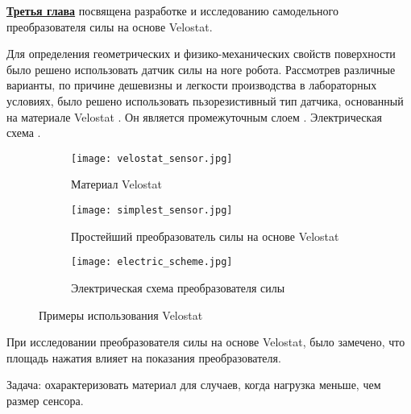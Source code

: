 
\textbf{\underline{Третья глава}} посвящена разработке и исследованию самодельного преобразователя силы на основе Velostat.

Для определения геометрических и физико-механических свойств поверхности было решено использовать датчик силы на ноге робота. Рассмотрев различные варианты, по причине дешевизны и легкости производства в лабораторных условиях, было решено использовать пьзорезистивный тип датчика, основанный на материале Velostat . Он является промежуточным слоем . Электрическая схема . 


\begin{figure}[ht]
    \begin{subfigure}[t]{0.33\textwidth}
        \centering\texttt{[image: velostat\_sensor.jpg]}
        \caption{Материал Velostat}
        \label{fig:velostat_sensor.jpg}
    \end{subfigure}
    \begin{subfigure}[t]{0.33\textwidth}
        \centering\texttt{[image: simplest\_sensor.jpg]}
        \caption{Простейший преобразователь силы на основе Velostat}
        \label{fig:simplest_sensor.jpg}
    \end{subfigure}
    \begin{subfigure}[t]{0.33\textwidth}
        \centering\texttt{[image: electric\_scheme.jpg]}\\
        \caption{Электрическая схема преобразователя силы}
        \label{fig:el_scheme}
    \end{subfigure}
    \caption{Примеры использования Velostat}
\end{figure}

При исследовании преобразователя силы на основе Velostat, было замечено, что площадь нажатия влияет на показания преобразователя. 

Задача: охарактеризовать материал для случаев, когда нагрузка меньше, чем размер сенсора.


